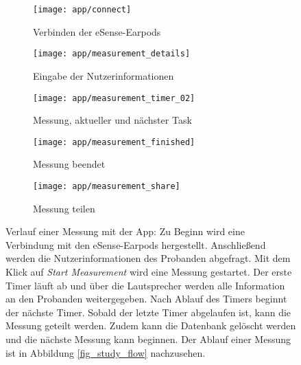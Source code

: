 \begin{figure}[ht]
  \centering
  \begin{subfigure}{.25\textwidth}
    \texttt{[image: app/connect]}
    \caption{Verbinden der eSense-Earpods}
    \label{implementation:app:screenshots:connect_bluetooth}
  \end{subfigure}
  \begin{subfigure}{.25\textwidth}
    \texttt{[image: app/measurement\_details]}
    \caption{Eingabe der Nutzerinformationen}
    \label{implementation:app:screenshots:user_studies_information}
  \end{subfigure}
  \begin{subfigure}{.25\textwidth}
    \texttt{[image: app/measurement\_timer\_02]}
    \caption{Messung, aktueller und nächster Task}
    \label{implementation:app:screenshots:measurement_started}
  \end{subfigure}
  \begin{subfigure}{.25\textwidth}
    \texttt{[image: app/measurement\_finished]}
    \caption{Messung beendet}
    \label{implementation:app:screenshots:sampling_stopped}
  \end{subfigure}
  \begin{subfigure}{.25\textwidth}
    \texttt{[image: app/measurement\_share]}
    \caption{Messung teilen}
    \label{implementation:app:screenshots:share}
  \end{subfigure}
  \caption{Verlauf einer Messung mit der App: Zu Beginn wird eine Verbindung mit den eSense-Earpods hergestellt. Anschließend werden die Nutzerinformationen des Probanden abgefragt. Mit dem Klick auf \textit{Start Measurement} wird eine Messung gestartet. Der erste Timer läuft ab und über die Lautsprecher werden alle Information an den Probanden weitergegeben. Nach Ablauf des Timers beginnt der nächste Timer. Sobald der letzte Timer abgelaufen ist, kann die Messung geteilt werden. Zudem kann die Datenbank gelöscht werden und die nächste Messung kann beginnen. Der Ablauf einer Messung ist in Abbildung \ref{fig_study_flow} nachzusehen.}
  \label{implementation:app:screenshots}
\end{figure}

